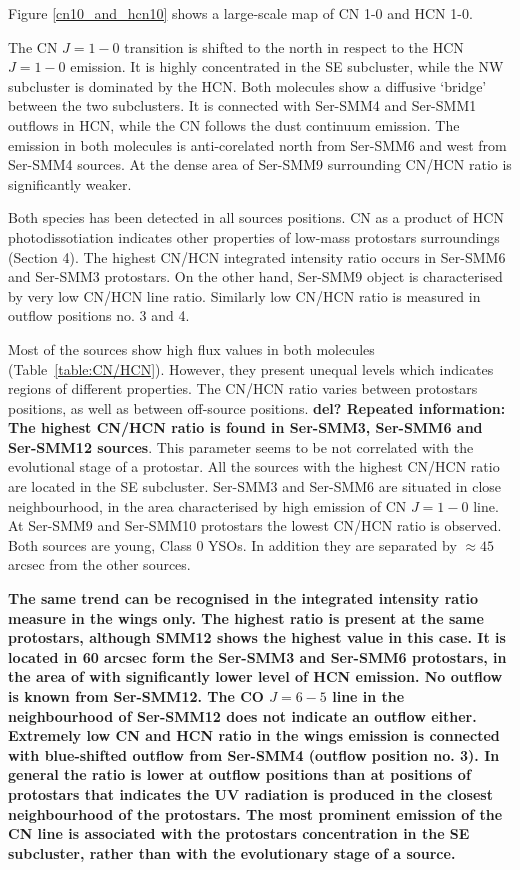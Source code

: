 \documentclass{aa}
\begin{document}
Figure \ref{cn10_and_hcn10} shows a large-scale map of CN 1-0 and HCN 1-0. 

The CN $J=1-0$ transition is shifted to the north in respect to the HCN $J=1-0$ emission. It is
highly concentrated in the SE subcluster, while the NW subcluster is dominated by the HCN. Both
molecules show a diffusive ‘bridge’ between the two subclusters. It is connected with Ser-SMM4 and
Ser-SMM1 outflows in HCN, while the CN follows the dust continuum emission. The emission in both
molecules is anti-corelated north from Ser-SMM6 and west from Ser-SMM4 sources. At the dense area of
Ser-SMM9 surrounding CN/HCN ratio is significantly weaker.

Both species has been detected in all sources positions. CN as a product of HCN photodissotiation
indicates other properties of low-mass protostars surroundings (Section 4). The highest CN/HCN
integrated intensity ratio occurs in Ser-SMM6 and Ser-SMM3 protostars. On the other hand, Ser-SMM9 object is characterised by very low CN/HCN line ratio.
Similarly low CN/HCN ratio is measured in outflow positions no. 3 and 4.

Most of the sources show high flux values in both molecules (Table~\ref{table:CN/HCN}). However,
they present unequal levels which indicates regions of different properties. The CN/HCN ratio varies
between protostars positions, as well as between off-source positions. \textbf{ del? Repeated information: The highest CN/HCN ratio is
found in Ser-SMM3, Ser-SMM6 and Ser-SMM12 sources}. This parameter seems to be not correlated with the
evolutional stage of a protostar. All the sources with the highest CN/HCN ratio are located in the
SE subcluster. Ser-SMM3 and Ser-SMM6 are situated in close neighbourhood, in the area characterised
by high emission of CN $J=1-0$ line. At Ser-SMM9 and Ser-SMM10 protostars the lowest CN/HCN ratio is
observed. Both sources are young, Class 0 YSOs. In addition they are separated by $\approx 45$
arcsec from the other sources.

\textbf{The same trend can be recognised in the integrated intensity ratio measure in the wings only. The highest ratio is present at the same protostars, although SMM12 shows the highest value in this case. It is located in 60 arcsec form the Ser-SMM3 and Ser-SMM6 protostars, in the area of with significantly lower level of HCN emission. No outflow is known from Ser-SMM12. The CO $J=6-5$ line in the neighbourhood of Ser-SMM12 does not indicate an outflow either. Extremely low CN and HCN ratio in the wings emission is connected with blue-shifted outflow from Ser-SMM4 (outflow position no. 3). In general the ratio is lower at outflow positions than at positions of protostars that indicates the UV radiation is produced in the closest neighbourhood of the protostars. The most prominent emission of the CN line is associated with the protostars concentration in the SE subcluster, rather than with the evolutionary stage of a source.}
\end{document}
